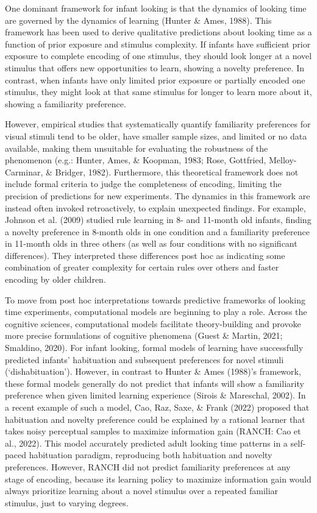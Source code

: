 \documentclass[10pt, letterpaper]{article}
\begin{document}
One dominant framework for infant looking is that the dynamics of
looking time are governed by the dynamics of learning (Hunter \& Ames,
1988). This framework has been used to derive qualitative predictions
about looking time as a function of prior exposure and stimulus
complexity. If infants have sufficient prior exposure to complete
encoding of one stimulus, they should look longer at a novel stimulus
that offers new opportunities to learn, showing a novelty preference. In
contrast, when infants have only limited prior exposure or partially
encoded one stimulus, they might look at that same stimulus for longer
to learn more about it, showing a familiarity preference.

However, empirical studies that systematically quantify familiarity
preferences for visual stimuli tend to be older, have smaller sample
sizes, and limited or no data available, making them unsuitable for
evaluating the robustness of the phenomenon (e.g.: Hunter, Ames, \&
Koopman, 1983; Rose, Gottfried, Melloy-Carminar, \& Bridger, 1982).
Furthermore, this theoretical framework does not include formal criteria
to judge the completeness of encoding, limiting the precision of
predictions for new experiments. The dynamics in this framework are
instead often invoked retroactively, to explain unexpected findings. For
example, Johnson et al. (2009) studied rule learning in 8- and 11-month
old infants, finding a novelty preference in 8-month olds in one
condition and a familiarity preference in 11-month olds in three others
(as well as four conditions with no significant differences). They
interpreted these differences post hoc as indicating some combination of
greater complexity for certain rules over others and faster encoding by
older children.

To move from post hoc interpretations towards predictive frameworks of
looking time experiments, computational models are beginning to play a
role. Across the cognitive sciences, computational models facilitate
theory-building and provoke more precise formulations of cognitive
phenomena (Guest \& Martin, 2021; Smaldino, 2020). For infant looking,
formal models of learning have successfully predicted infants'
habituation and subsequent preferences for novel stimuli
(`dishabituation'). However, in contrast to Hunter \& Ames (1988)'s
framework, these formal models generally do not predict that infants
will show a familiarity preference when given limited learning
experience (Sirois \& Mareschal, 2002). In a recent example of such a
model, Cao, Raz, Saxe, \& Frank (2022) proposed that habituation and
novelty preference could be explained by a rational learner that takes
noisy perceptual samples to maximize information gain (RANCH: Cao et
al., 2022). This model accurately predicted adult looking time patterns
in a self-paced habituation paradigm, reproducing both habituation and
novelty preferences. However, RANCH did not predict familiarity
preferences at any stage of encoding, because its learning policy to
maximize information gain would always prioritize learning about a novel
stimulus over a repeated familiar stimulus, just to varying degrees.
\end{document}
